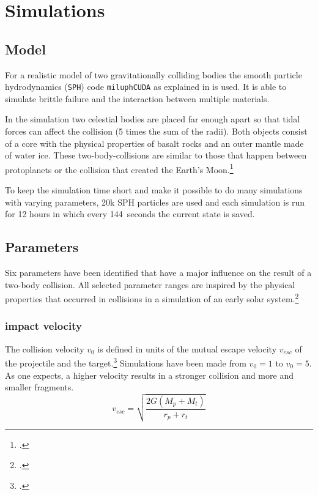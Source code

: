 \chapter{Simulations}
\label{chapter:simulations}
\section{Model}

For a realistic model of two gravitationally colliding bodies the smooth particle hydrodynamics (\texttt{SPH}) code \texttt{miluphCUDA} as explained in \cite{Schaefer2016} is used. It is able to simulate brittle failure and the interaction between multiple materials. 

In the simulation two celestial bodies are placed far enough apart so that tidal forces can affect the collision (5 times the sum of the radii). Both objects consist of a core with the physical properties of basalt rocks and an outer mantle made of water ice. These two-body-collisions are similar to those that happen between protoplanets or the collision that created the Earth's Moon.\footcite{dvorakMoon}

To keep the simulation time short and make it possible to do many simulations with varying parameters, 20k SPH particles are used and each simulation is run for 12 hours in which every 144~seconds the current state is saved.

\section{Parameters}
\label{sec:parameters}

Six parameters have been identified that have a major influence on the result of a two-body collision. All selected parameter ranges are inspired by the physical properties that occurred in collisions in a simulation of an early solar system.\footcite{CollisionParameters}

\subsection{impact velocity}

The collision velocity $v_0$ is defined in units of the mutual escape velocity $v_{esc}$ of the projectile and the target.\footcite{MaindlSummary} Simulations have been made from $v_0=1$ to $v_0=5$. As one expects, a higher velocity results in a stronger collision and more and smaller fragments.
\begin{equation}
	v_{esc}=\sqrt{\frac{2G(M_p+M_t)}{r_p+r_t}}
\end{equation}

